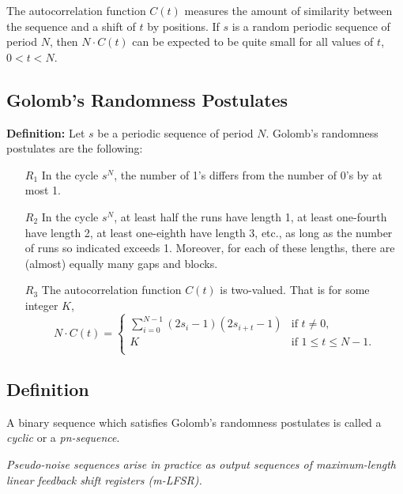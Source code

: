 \documentclass[12pt,openany]{book}
\theoremstyle{definition}
\begin{document}
	The autocorrelation function \( C(t) \) measures the amount of similarity between the sequence and a shift of \( t \) by positions. If \( s \) is a random periodic sequence of period \( N \), then \( N \cdot C(t) \) can be expected to be quite small for all values of \( t \), \( 0 < t < N \).
	
	\subsection*{Golomb’s Randomness Postulates}
	\textbf{Definition:} Let \( s \) be a periodic sequence of period \( N \). Golomb’s randomness postulates are the following:
	\begin{enumerate}
		\item[\( R_1 \)] In the cycle \( s^N \), the number of 1’s differs from the number of 0’s by at most 1.
		\item[\( R_2 \)] In the cycle \( s^N \), at least half the runs have length 1, at least one-fourth have length 2, at least one-eighth have length 3, etc., as long as the number of runs so indicated exceeds 1. Moreover, for each of these lengths, there are (almost) equally many gaps and blocks.
		\item[\( R_3 \)] The autocorrelation function \( C(t) \) is two-valued. That is for some integer \( K \),
		\[ N \cdot C(t) = \begin{cases} 
			\sum_{i=0}^{N-1} (2s_i - 1)(2s_{i+t} - 1) & \text{if } t \neq 0, \\
			K & \text{if } 1 \leq t \leq N - 1. \\
		\end{cases} \]
	\end{enumerate}
	
\subsection*{Definition}
A binary sequence which satisfies Golomb's randomness postulates is called a \textit{cyclic} or a \textit{pn-sequence}.

\textit{Pseudo-noise sequences arise in practice as output sequences of maximum-length linear feedback shift registers (m-LFSR).}
\end{document}

